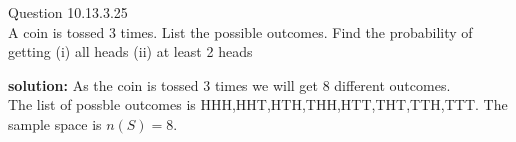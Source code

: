 \documentclass{article}
\begin{document}
\providecommand{\pr}[1]{\ensuremath{\Pr\left(#1\right)}}
\providecommand{\brak}[1]{\ensuremath{\left(#1\right)}}
\newcommand{\solution}{\noindent \textbf{solution: }}


Question 10.13.3.25\\
A coin is tossed 3 times. List the possible outcomes. Find the probability of getting
(i) all heads (ii) at least 2 heads 

\solution
As the coin is tossed 3 times we will get 8 different outcomes.\\
The list of possble outcomes is {HHH,HHT,HTH,THH,HTT,THT,TTH,TTT}.
The sample space is $n(S)=8$.
\end{document}
